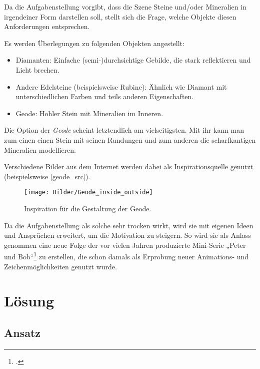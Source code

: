 \documentclass{scrreprt}
\begin{document}
Da die Aufgabenstellung vorgibt, dass die Szene Steine und/oder Mineralien in irgendeiner Form darstellen soll, stellt sich die Frage, welche Objekte diesen Anforderungen entsprechen. 

Es werden Überlegungen zu folgenden Objekten angestellt:
\begin{itemize}
\item Diamanten: Einfache (semi-)durchsichtige Gebilde, die stark reflektieren und Licht brechen.
\item Andere Edelsteine (beispielsweise Rubine): Ähnlich wie Diamant mit unterschiedlichen Farben und teils anderen Eigenschaften.
\item Geode: Hohler Stein mit Mineralien im Inneren.
\end{itemize}

Die Option der \emph{Geode} scheint letztendlich am vielseitigsten. Mit ihr kann man zum einen einen Stein mit seinen Rundungen und zum anderen die scharfkantigen Mineralien modellieren.

Verschiedene Bilder aus dem Internet werden dabei als Inspirationsquelle genutzt (beispielsweise \autoref{geode_src}).

\begin{figure}[!ht]
\centering
\texttt{[image: Bilder/Geode\_inside\_outside]}
\caption[Inspiration für die Gestaltung der Geode.]{Inspiration für die Gestaltung der Geode\protect\footnotemark .}
\label{geode_src}
\end{figure}

Da die Aufgabenstellung als solche sehr trocken wirkt, wird sie mit eigenen Ideen und Ansprüchen erweitert, um die Motivation zu steigern. So wird sie als Anlass genommen eine neue Folge der vor vielen Jahren produzierte Mini-Serie „Peter und Bob“\footcite{Strube2017yt} zu erstellen, die schon damals als Erprobung neuer Animations- und Zeichenmöglichkeiten genutzt wurde.

\chapter{Lösung}
\section{Ansatz}
\end{document}

